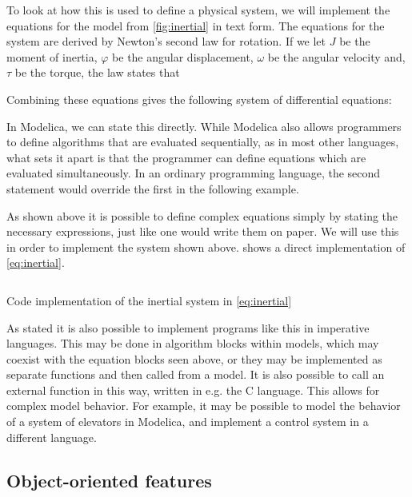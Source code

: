 \documentclass[\rootfolder/main.tex]{subfiles}
\begin{document}
\inputminted[fontsize=\footnotesize]{Modelica}{Listings/simultaneous.txt}

To look at how this is used to define a physical system, we will implement the equations for the model from \cref{fig:inertial} in text form.
The equations for the system are derived by Newton's second law for rotation.
If we let $J$ be the moment of inertia, $\varphi$ be the angular displacement, $\omega$ be the angular velocity and, $\tau$ be the torque, the law states that


Combining these equations gives the following system of differential equations:


In Modelica, we can state this directly.
While Modelica also allows programmers to define algorithms that are evaluated sequentially, as in most other languages, what sets it apart is that the programmer can define equations which are evaluated simultaneously.
In an ordinary programming language, the second statement would override the first in the following example.

As shown above it is possible to define complex equations simply by stating the necessary expressions, just like one would write them on paper.
We will use this in order to implement the system shown above.
 shows a direct implementation of \cref{eq:inertial}.

\begin{listing}[ht]
    \inputminted[fontsize=\footnotesize]{Modelica}{\rootfolder/Models/MasterProject/Models/InertialCode.mo}
    \caption{Code implementation of the inertial system in \cref{eq:inertial}}
    \label{lst:inertial-code}
\end{listing}

As stated it is also possible to implement programs like this in imperative languages.
This may be done in algorithm blocks within models, which may coexist with the equation blocks seen above, or they may be implemented as separate functions and then called from a model.
It is also possible to call an external function in this way, written in e.g. the C language.
This allows for complex model behavior.
For example, it may be possible to model the behavior of a system of elevators in Modelica, and implement a control system in a different language.

\subsection{Object-oriented features}
\end{document}
